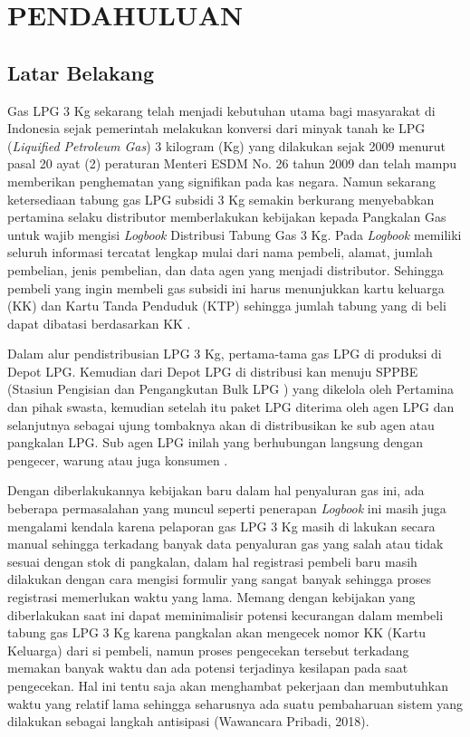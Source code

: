 
\chapter{PENDAHULUAN}

\section{Latar Belakang}
Gas LPG 3 Kg sekarang telah menjadi kebutuhan utama bagi masyarakat di Indonesia sejak pemerintah melakukan konversi dari minyak tanah ke LPG (\textit{Liquified Petroleum Gas}) 3 kilogram (Kg) yang dilakukan sejak 2009 menurut pasal 20 ayat (2) peraturan Menteri ESDM No. 26 tahun 2009 dan telah mampu memberikan penghematan yang signifikan pada kas negara. Namun sekarang ketersediaan tabung gas LPG subsidi 3 Kg semakin berkurang menyebabkan pertamina selaku distributor memberlakukan kebijakan kepada Pangkalan Gas untuk wajib mengisi \textit{Logbook} Distribusi Tabung Gas 3 Kg. Pada \textit{Logbook} memiliki seluruh informasi tercatat lengkap mulai dari nama pembeli, alamat, jumlah pembelian, jenis pembelian, dan data agen yang menjadi distributor. Sehingga  pembeli yang ingin membeli gas subsidi ini harus menunjukkan kartu keluarga (KK) dan Kartu Tanda Penduduk (KTP) sehingga jumlah tabung yang di beli dapat dibatasi berdasarkan KK \citep{antaraRiau}.
\par Dalam alur pendistribusian LPG 3 Kg, pertama-tama gas LPG di produksi di Depot LPG. Kemudian dari Depot LPG di distribusi kan menuju SPPBE (Stasiun Pengisian dan Pengangkutan Bulk LPG ) yang dikelola oleh Pertamina dan pihak swasta, kemudian setelah itu paket LPG diterima oleh agen LPG dan selanjutnya sebagai ujung tombaknya akan di distribusikan ke sub agen atau pangkalan LPG. Sub agen LPG inilah yang berhubungan langsung dengan pengecer, warung atau juga konsumen \citep{alurLPG}.
\par Dengan diberlakukannya kebijakan baru dalam hal penyaluran gas ini, ada beberapa permasalahan yang muncul seperti penerapan \textit{Logbook} ini masih juga mengalami kendala karena pelaporan gas LPG 3 Kg masih di lakukan secara manual sehingga terkadang banyak data penyaluran gas yang salah atau tidak sesuai dengan stok di pangkalan, dalam hal registrasi pembeli baru masih dilakukan dengan cara mengisi formulir yang sangat banyak sehingga proses registrasi memerlukan waktu yang lama. Memang dengan kebijakan yang diberlakukan saat ini dapat meminimalisir potensi kecurangan dalam membeli tabung gas LPG 3 Kg karena pangkalan akan mengecek nomor KK (Kartu Keluarga) dari si pembeli, namun proses pengecekan tersebut terkadang memakan banyak waktu dan ada potensi terjadinya kesilapan pada saat pengecekan.  Hal ini tentu saja akan menghambat pekerjaan dan membutuhkan waktu yang relatif lama sehingga seharusnya ada suatu pembaharuan sistem yang dilakukan sebagai langkah antisipasi (Wawancara Pribadi,
2018).

